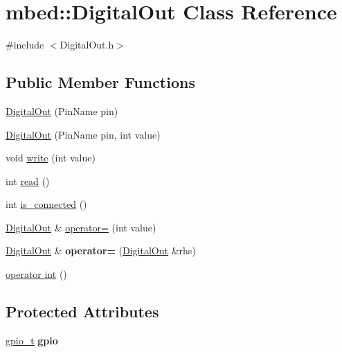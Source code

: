 \hypertarget{classmbed_1_1DigitalOut}{}\section{mbed\+:\+:Digital\+Out Class Reference}
\label{classmbed_1_1DigitalOut}


{\ttfamily \#include $<$Digital\+Out.\+h$>$}

\subsection*{Public Member Functions}
\begin{DoxyCompactItemize}
\item 
\hyperlink{classmbed_1_1DigitalOut_aad0eaa96c3fad0b2e31c167d616fe3c2}{Digital\+Out} (Pin\+Name pin)
\item 
\hyperlink{classmbed_1_1DigitalOut_a6068274615ee97f1ff3a3ceb701faa26}{Digital\+Out} (Pin\+Name pin, int value)
\item 
void \hyperlink{classmbed_1_1DigitalOut_a780c53a27d6ef36e8f57dc796d4c117c}{write} (int value)
\item 
int \hyperlink{classmbed_1_1DigitalOut_aee5b6dba79cb58aa87a18b3dc38621bd}{read} ()
\item 
int \hyperlink{classmbed_1_1DigitalOut_ae0166d6aa26e5befe5a51058a132503c}{is\+\_\+connected} ()
\item 
\hyperlink{classmbed_1_1DigitalOut}{Digital\+Out} \& \hyperlink{classmbed_1_1DigitalOut_a99e9d68df5fb296fbaf1c682aae3ce41}{operator=} (int value)
\item 
\hyperlink{classmbed_1_1DigitalOut}{Digital\+Out} \& {\bfseries operator=} (\hyperlink{classmbed_1_1DigitalOut}{Digital\+Out} \&rhs)\hypertarget{classmbed_1_1DigitalOut_ad3a4dbb96e5cef32aefdf2e98ea7baf2}{}\label{classmbed_1_1DigitalOut_ad3a4dbb96e5cef32aefdf2e98ea7baf2}

\item 
\hyperlink{classmbed_1_1DigitalOut_afa966c7a9c8a66c499839c7be55d2d9b}{operator int} ()
\end{DoxyCompactItemize}
\subsection*{Protected Attributes}
\begin{DoxyCompactItemize}
\item 
\hyperlink{structgpio__t}{gpio\+\_\+t} {\bfseries gpio}\hypertarget{classmbed_1_1DigitalOut_a3f5716320aba4d372a74107f95a97c81}{}\label{classmbed_1_1DigitalOut_a3f5716320aba4d372a74107f95a97c81}

\end{DoxyCompactItemize}



